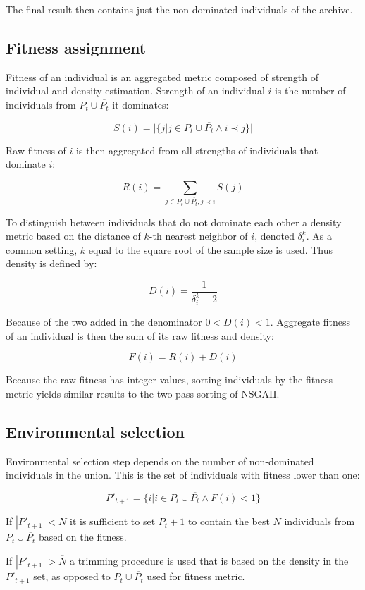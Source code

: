 \documentclass[12pt,oneside]{fithesis2}
\begin{document}
The final result then contains just the non-dominated individuals of the archive.

\subsection{Fitness assignment}
	Fitness of an individual is an aggregated metric composed of strength of individual and density estimation. Strength of an individual $i$ is the number of individuals from $P_t \cup \overline{P_t}$ it dominates:

$$ S(i) = |\{j| j \in P_t \cup \overline{P_t} \land i \prec j\}| $$

Raw fitness of $i$ is then aggregated from all strengths of individuals that dominate $i$:

$$ R(i) = \sum\limits_{j \in P_t \cup \overline{P_t},j \prec i} S(j)$$

To distinguish between individuals that do not dominate each other a density metric based on the distance of $k$-th nearest neighbor of $i$, denoted $\delta^k_i$. As a common setting, $k$ equal to the square root of the sample size is used. Thus density is defined by:

$$D(i) = \frac{1}{\delta^k_i + 2} $$

Because of the two added in the denominator  $0 < D(i) < 1$. Aggregate fitness of an individual is then the sum of its raw fitness and density:

$$F(i) = R(i) + D(i) $$

Because the raw fitness has integer values, sorting individuals by the fitness metric yields similar results to the two pass sorting of NSGAII.

\subsection{Environmental selection}
Environmental selection step depends on the number of non-dominated individuals in the union. This is the set of individuals with fitness lower than one:

$$P'_{t+1} =\{i | i \in P_t \cup \overline{P_t} \land F(i)<1\}$$

If $|P'_{t+1}| < \overline N$ it is sufficient to set $\overline{P_t+1}$ to contain the best $\overline N$ individuals from $P_t \cup \overline{P_t}$ based on the fitness.

If $|P'_{t+1}| > \overline N$ a trimming procedure is used that is based on the density in the $P'_{t+1}$ set, as opposed to $P_t \cup \overline{P_t}$ used for fitness metric.
\end{document}
